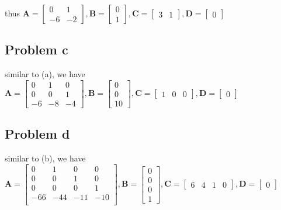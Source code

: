 \documentclass[12pt,a4paper]{article}
\begin{document}
thus
$
    \mathbf{A} =
    \begin{bmatrix}
        0  & 1  \\
        -6 & -2
    \end{bmatrix},
    \mathbf{B} =
    \begin{bmatrix}
        0 \\
        1
    \end{bmatrix},
    \mathbf{\mathbf{C}} = \begin{bmatrix}
        3 & 1
    \end{bmatrix},
    \mathbf{D} =
    \begin{bmatrix}
        0
    \end{bmatrix}
$

\subsection*{Problem c}
similar to (a), we have
$
\mathbf{A} = \begin{bmatrix}
    0  & 1 & 0  \\
    0 & 0 & 1 \\
    -6 & -8 & -4
\end{bmatrix},
\mathbf{B} = \begin{bmatrix}
    0 \\
    0 \\
    10
\end{bmatrix},
\mathbf{\mathbf{C}} = \begin{bmatrix}
    1 & 0 &0
\end{bmatrix},
\mathbf{D} = \begin{bmatrix}
    0
\end{bmatrix}
$

\subsection*{Problem d}
similar to (b), we have
$
\mathbf{A} = \begin{bmatrix}
    0 & 1 & 0 & 0 \\
    0 & 0 & 1 & 0 \\
    0 & 0 & 0 & 1 \\
    -66 & -44 & -11 & -10 \\
\end{bmatrix},
\mathbf{B}= \begin{bmatrix}
    0 \\
    0 \\
    0 \\
    1
\end{bmatrix},
\mathbf{\mathbf{C}}= \begin{bmatrix}
    6 & 4 & 1 & 0
\end{bmatrix},
\mathbf{D} = \begin{bmatrix}
    0
\end{bmatrix}
$
\end{document}
